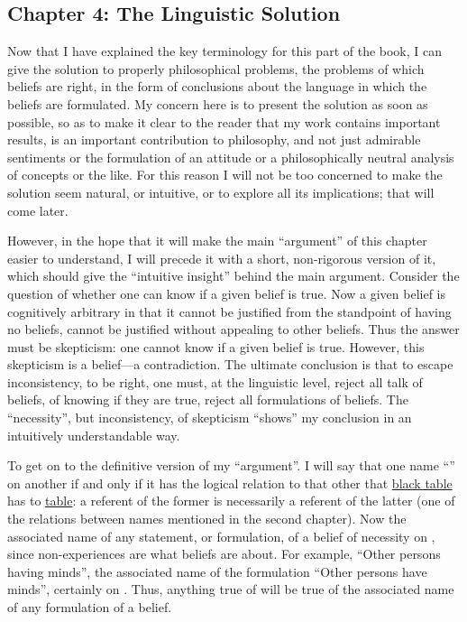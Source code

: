 \subsection[Chapter 4: The Linguistic Solution][The Linguistic Solution]{Chapter 4: The Linguistic Solution}

Now that I have explained the key terminology for this part of the 
book, I can give the solution to properly philosophical problems, the 
problems of which beliefs are right, in the form of conclusions about the 
language in which the beliefs are formulated. My concern here is to present 
the solution as soon as possible, so as to make it clear to the reader that my 
work contains important results, is an important contribution to philosophy, 
and not just admirable sentiments or the formulation of an attitude or a 
philosophically neutral analysis of concepts or the like. For this reason I will 
not be too concerned to make the solution seem natural, or intuitive, or to 
explore all its implications; that will come later. 

However, in the hope that it will make the main \enquote{argument} of this 
chapter easier to understand, I will precede it with a short, non-rigorous 
version of it, which should give the \enquote{intuitive insight} behind the main 
argument. Consider the question of whether one can know if a given belief is 
true. Now a given belief is cognitively arbitrary in that it cannot be justified 
from the standpoint of having no beliefs, cannot be justified without 
appealing to other beliefs. Thus the answer must be skepticism: one cannot 
know if a given belief is true. However, this skepticism is a belief---a 
contradiction. The ultimate conclusion is that to escape inconsistency, to be 
right, one must, at the linguistic level, reject all talk of beliefs, of knowing if 
they are true, reject all formulations of beliefs. The \enquote{necessity}, but 
inconsistency, of skepticism \enquote{shows} my conclusion in an intuitively 
understandable way. 

To get on to the definitive version of my \enquote{argument}. I will say that 
one name \enquote{} on another if and only if it has the logical relation to 
that other that \uline{black table} has to \uline{table}: a referent of the former is 
necessarily a referent of the latter (one of the relations between names 
mentioned in the second chapter). Now the associated name of any 
statement, or formulation, of a belief of necessity  on 
, since non-experiences are what beliefs are about. For 
example, \enquote{Other persons having minds}, the associated name of the 
formulation \enquote{Other persons have minds}, certainly  on 
. Thus, anything true of  will be true of the 
associated name of any formulation of a belief. 

